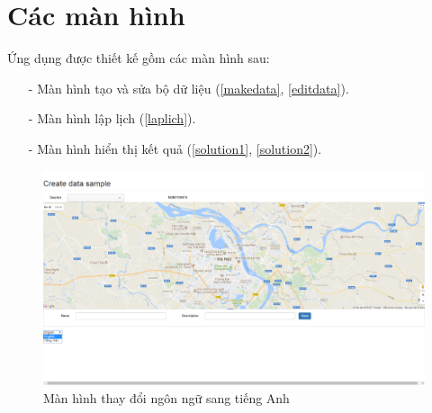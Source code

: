 \documentclass[a4paper,12pt]{report}
\begin{document}
\section{Các màn hình}
Ứng dụng được thiết kế gồm các màn hình sau: 
\begin{itemize}
\item[-] Màn hình tạo và sửa bộ dữ liệu (\ref{makedata}, \ref{editdata}).
\item[-] Màn hình lập lịch (\ref{laplich}).
\item[-] Màn hình hiển thị kết quả (\ref{solution1}, \ref{solution2}).
\end{itemize}
\begin{figure}

\includegraphics[scale=0.41]{screen/changeLanguage.png}
\caption{Màn hình thay đổi ngôn ngữ sang tiếng Anh}
\label{changelanguage}
\end{figure}
\end{document}
